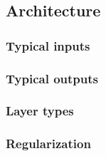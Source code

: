 \subsection{Architecture}
	\subsubsection{Typical inputs}
	\subsubsection{Typical outputs}
	\subsubsection{Layer types}
	\subsubsection{Regularization}
